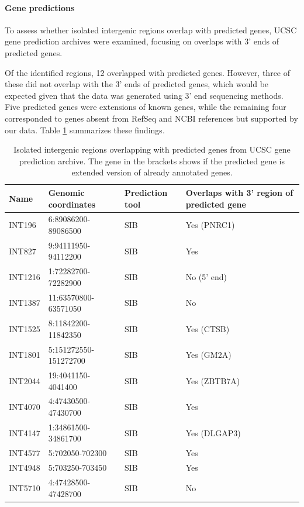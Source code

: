 \paragraph{Gene predictions}

To assess whether isolated intergenic regions overlap with predicted genes, UCSC gene prediction archives were examined,
focusing on overlaps with 3' ends of predicted genes.

Of the identified regions, 12 overlapped with predicted genes.
However, three of these did not overlap with the 3' ends of predicted genes,
which would be expected given that the data was generated using 3' end sequencing methods.
Five predicted genes were extensions of known genes,
while the remaining four corresponded to genes absent from RefSeq and NCBI references but supported by our data.
Table \ref{tab:predictedIsolated} summarizes these findings.

\begin{table}[h]
    \centering
    \begin{tabular}{llll}
        \toprule
        Name & Genomic coordinates & Prediction tool & Overlaps with 3' region of predicted gene \\
        \midrule
	INT196 & 6:89086200-89086500 & SIB & Yes (PNRC1) \\
	INT827 & 9:94111950-94112200 & SIB & Yes \\
	INT1216 & 1:72282700-72282900 & SIB & No (5' end) \\
	INT1387 & 11:63570800-63571050 & SIB & No \\
	INT1525 & 8:11842200-11842350 & SIB & Yes (CTSB) \\
	INT1801 & 5:151272550-151272700 & SIB & Yes (GM2A) \\
	INT2044 & 19:4041150-4041400 & SIB & Yes (ZBTB7A) \\
	INT4070 & 4:47430500-47430700 & SIB & Yes \\
	INT4147 & 1:34861500-34861700 & SIB & Yes (DLGAP3)\\
	INT4577 & 5:702050-702300 & SIB & Yes \\
	INT4948 & 5:703250-703450 & SIB & Yes \\
	INT5710 & 4:47428500-47428700 & SIB & No \\
        \bottomrule
    \end{tabular}
    \caption{Isolated intergenic regions overlapping with predicted genes from UCSC gene prediction archive.
    The gene in the brackets shows if the predicted gene is extended version of already annotated genes.}
    \label{tab:predictedIsolated}
\end{table}

